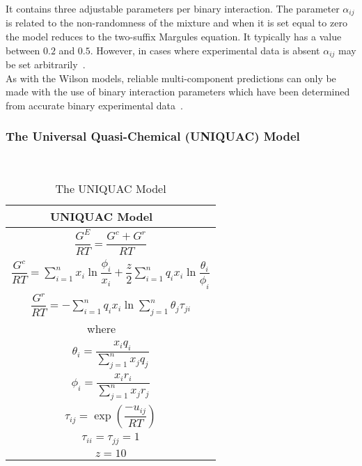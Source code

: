 It contains three adjustable parameters per binary interaction. The parameter $\alpha_{ij}$ is related to the non-randomness of the mixture and when it is set equal to zero the model reduces to the two-suffix Margules equation. It typically has a value between $0.2$ and $0.5$. However, in cases where experimental data is absent $\alpha_{ij}$ may be set arbitrarily~\cite{MolecularThermodynamicsOfFluidPhaseEquilibria}.\\

 As with the Wilson models, reliable multi-component predictions can only be made with the use of binary interaction parameters which have been determined from accurate binary experimental data~\cite{ThermophysicalProperties}.\


\subsubsection{The Universal Quasi-Chemical (UNIQUAC) Model}\

\begin{table}
			\caption{The UNIQUAC Model}\label{UNIQUACTable}
			\begin{center}
			\begin{tabular}{cc}
			\toprule
			\textbf{UNIQUAC Model}&\\
			\midrule
			\multicolumn{2}{c}{$ \dfrac{G^{E}}{RT} = \dfrac{G^{c}+G^{r}}{RT}$}\\
			\multicolumn{2}{c}{$ \dfrac{G^{c}}{RT} = \sum_{i=1}^{n} x_{i} \ln \dfrac{\phi_{i}}{x_{i}} + \dfrac{z}{2}\sum_{i=1}^{n}q_{i}x_{i}\ln \dfrac{\theta_{i}}{\phi_{i}}$}\\
			\multicolumn{2}{c}{$ \dfrac{G^{r}}{RT} = -\sum_{i=1}^{n}q_{i}x_{i}\ln \sum_{j=1}^{n}\theta_{j} \tau_{ji}$}\\
			where&\\
			\multicolumn{2}{c}{$ \theta_{i} = \dfrac{x_{i}q_{i}}{\sum_{j=1}^{n}x_{j}q_{j}}$}\\
			\multicolumn{2}{c}{$ \phi_{i} = \dfrac{x_{i}r_{i}}{\sum_{j=1}^{n}x_{j}r_{j}}$}\\
			\multicolumn{2}{c}{$ \tau_{ij} = \exp\left(\dfrac{-u_{ij}}{RT}\right)$}\\
			\multicolumn{2}{c}{$\tau_{ii}= \tau_{jj} = 1$}\\			
			\multicolumn{2}{c}{$z = 10$}\\			
			\bottomrule
			\end{tabular}
			\end{center}
\end{table}

